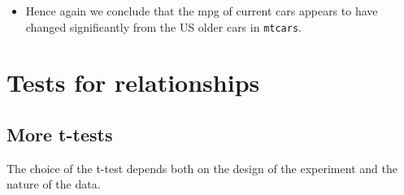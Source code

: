 \documentclass[]{article}
\providecommand{\tightlist}{%
  \setlength{\itemsep}{0pt}\setlength{\parskip}{0pt}}
\begin{document}
\begin{itemize}
\tightlist
\item
  Hence again we conclude that the mpg of current cars appears to have changed significantly from the US older cars in \texttt{mtcars}.
\end{itemize}

\hypertarget{testsforrelationships}{%
\section{Tests for relationships}\label{testsforrelationships}}

\hypertarget{more-t-tests}{%
\subsection{More t-tests}\label{more-t-tests}}

The choice of the t-test depends both on the design of the experiment and the nature of the data.
\end{document}
